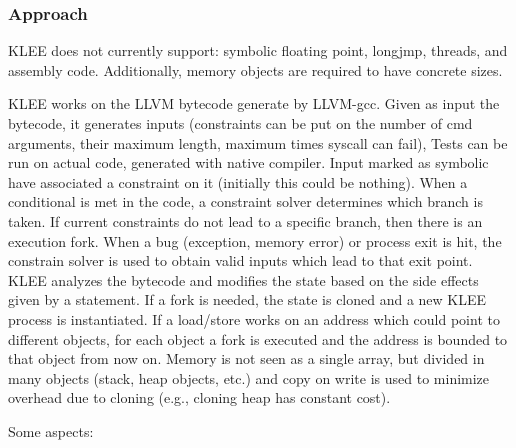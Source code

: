 \documentclass[10pt, a4paper]{article}
\begin{document}
\subsubsection{Approach}

KLEE does not currently support: symbolic floating point, longjmp, threads, and assembly code. Additionally, memory objects are required to have concrete sizes.

KLEE works on the LLVM bytecode generate by LLVM-gcc. Given as input the bytecode, it generates inputs (constraints can be put on the number of cmd arguments, their maximum length, maximum times syscall can fail), Tests can be run on actual code, generated with native compiler. Input marked as symbolic have associated a constraint on it (initially this could be nothing). When a conditional is met in the code, a constraint solver determines which branch is taken. If current constraints do not lead to a specific branch, then there is an execution fork. When a bug (exception, memory error) or process exit is hit, the constrain solver is used to obtain valid inputs which lead to that exit point. KLEE analyzes the bytecode and modifies the state based on the side effects given by a statement. If a fork is needed, the state is cloned and a new KLEE process is instantiated. If a load/store works on an address which could point to different objects, for each object a fork is executed and the address is bounded to that object from now on. Memory is not seen as a single array, but divided in many objects (stack, heap objects, etc.) and copy on write is used to minimize overhead due to cloning (e.g., cloning heap has constant cost).

Some aspects:
\end{document}
